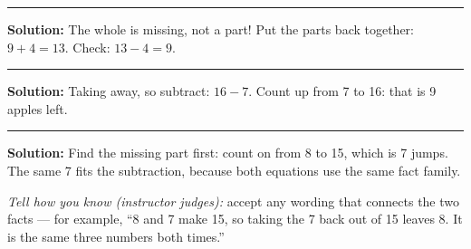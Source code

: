 \documentclass[12pt]{article}
\begin{document}
\vspace{0.2cm}\noindent\rule{\linewidth}{0.2pt}\vspace{0.1cm}


\textbf{Solution:} The whole is missing, not a part! Put the parts back
together: $9 + 4 = 13$. Check: $13 - 4 = 9$. 

\vspace{0.2cm}\noindent\rule{\linewidth}{0.2pt}\vspace{0.1cm}


\textbf{Solution:} Taking away, so subtract: $16 - 7$. Count up from 7 to 16:
that is 9 apples left. 

\vspace{0.2cm}\noindent\rule{\linewidth}{0.2pt}\vspace{0.1cm}


\textbf{Solution:} Find the missing part first: count on from 8 to 15, which
is 7 jumps. The same 7 fits the subtraction, because both equations use the
same fact family. 

\emph{Tell how you know (instructor judges):} accept any wording that
connects the two facts --- for example, ``8 and 7 make 15, so taking the 7
back out of 15 leaves 8. It is the same three numbers both times.''
\end{document}
